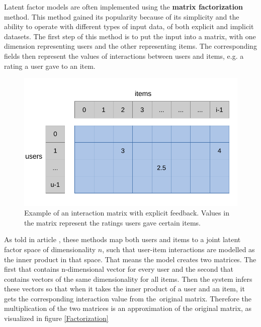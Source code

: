 Latent factor models are often implemented using the \textbf{matrix factorization} method. This method gained its popularity because of its simplicity and the ability to operate with different types of input data, of both explicit and implicit datasets. The first step of this method is to put the input into a matrix, with one dimension representing users and the other representing items. The corresponding fields then represent the values of interactions between users and items, e.g. a rating a user gave to an item.

\begin{figure}[H]
    \centering
    \includegraphics{obrazky-figures/matrix.pdf}
    \caption{Example of an interaction matrix with explicit feedback. Values in the matrix represent the ratings users gave certain items. \cite{GoogleCloud}}
    \label{Matrix}
\end{figure}

As told in article \cite{MF}, these methods map both users and items to a joint latent factor space of dimensionality $n$, such that user-item interactions are modelled as the inner product in that space. That means the model creates two matrices. The first that contains n-dimensional vector for every user and the second that contains vectors of the same dimensionality for all items. Then the system infers these vectors so that when it takes the inner product of a user and an item, it gets the corresponding interaction value from the~original matrix. Therefore the multiplication of the two matrices is an approximation of the original matrix, as visualized in figure \ref{Factorization}

